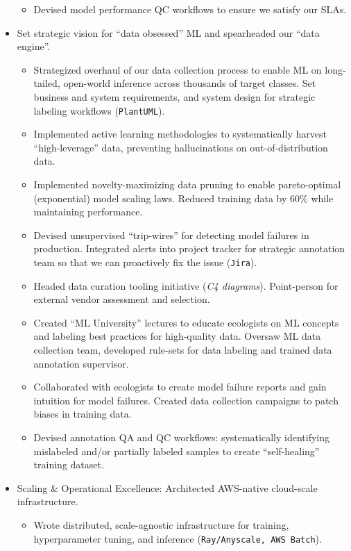 \documentclass[a4paper,12pt]{article}
\begin{document}
\begin{itemize}
\begin{itemize}
            \item Devised model performance QC workflows to ensure we satisfy our SLAs.
        \end{itemize}
        \item Set strategic vision for ``data obsessed'' ML and spearheaded our ``data engine''.
        \begin{itemize}
            \item Strategized overhaul of our data collection process to enable ML on long-tailed, open-world inference across thousands of target classes. Set business and system requirements, and system design for strategic labeling workflows (\texttt{PlantUML}).
            \item Implemented active learning methodologies to systematically harvest ``high-leverage'' data, preventing hallucinations on out-of-distribution data.
            \item Implemented novelty-maximizing data pruning to enable pareto-optimal (exponential) model scaling laws. Reduced training data by 60\% while maintaining performance.
            \item Devised unsupervised ``trip-wires'' for detecting model failures in production. Integrated alerts into project tracker for strategic annotation team so that we can proactively fix the issue (\texttt{Jira}).
            \item Headed data curation tooling initiative (\textit{C4 diagrams}). Point-person for external vendor assessment and selection.
            \item Created ``ML University'' lectures to educate ecologists on ML concepts and labeling best practices for high-quality data. Oversaw ML data collection team, developed rule-sets for data labeling and trained data annotation supervisor.
            \item Collaborated with ecologists to create model failure reports and gain intuition for model failures. Created data collection campaigns to patch biases in training data.
            \item Devised annotation QA and QC workflows: systematically identifying mislabeled and/or partially labeled samples to create ``self-healing'' training dataset.
        \end{itemize}
        \item Scaling \& Operational Excellence: Architected AWS-native cloud-scale infrastructure.
        \begin{itemize}
            \item Wrote distributed, scale-agnostic infrastructure for training, hyperparameter tuning, and inference (\texttt{Ray/Anyscale, AWS Batch}).

\end{itemize}
\end{itemize}
\end{document}
